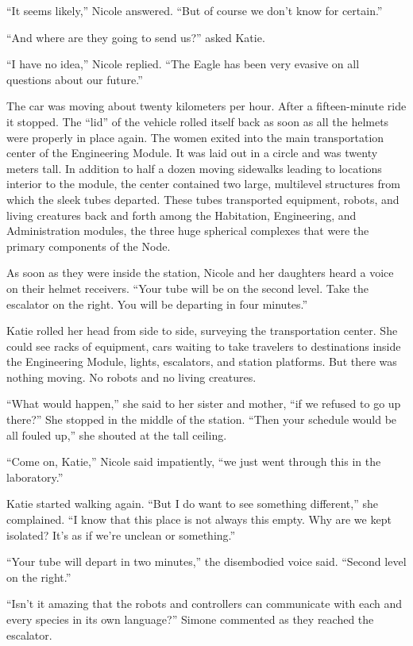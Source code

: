 \documentclass[]{article}
\begin{document}
{“It seems likely,” Nicole answered.  “But of course we don’t know for certain.”

“And where are they going to send us?” asked Katie.

“I have no idea,” Nicole replied.  “The Eagle has been very evasive on all questions about our future.”

The car was moving about twenty kilometers per hour.  After a fifteen-minute ride it stopped.  The “lid” of the vehicle rolled itself back as soon as all the helmets were properly in place again.  The women exited into the main transportation center of the Engineering Module.  It was laid out in a circle and was twenty meters tall.  In addition to half a dozen moving sidewalks leading to locations interior to the module, the center contained two large, multilevel structures from which the sleek tubes departed.  These tubes transported equipment, robots, and living creatures back and forth among the Habitation, Engineering, and Administration modules, the three huge spherical complexes that were the primary components of the Node.

As soon as they were inside the station, Nicole and her daughters heard a voice on their helmet receivers.  “Your tube will be on the second level.  Take the escalator on the right.  You will be departing in four minutes.”

Katie rolled her head from side to side, surveying the transportation center.  She could see racks of equipment, cars waiting to take travelers to destinations inside the Engineering Module, lights, escalators, and station platforms.  But there was nothing moving.  No robots and no living creatures.

“What would happen,” she said to her sister and mother, “if we refused to go up there?” She stopped in the middle of the station.  “Then your schedule would be all fouled up,” she shouted at the tall ceiling.

“Come on, Katie,” Nicole said impatiently, “we just went through this in the laboratory.”

Katie started walking again.  “But I do want to see something different,” she complained.  “I know that this place is not always this empty.  Why are we kept isolated? It’s as if we’re unclean or something.”

“Your tube will depart in two minutes,” the disembodied voice said.  “Second level on the right.”

“Isn’t it amazing that the robots and controllers can communicate with each and every species in its own language?” Simone commented as they reached the escalator.

}
\end{document}
